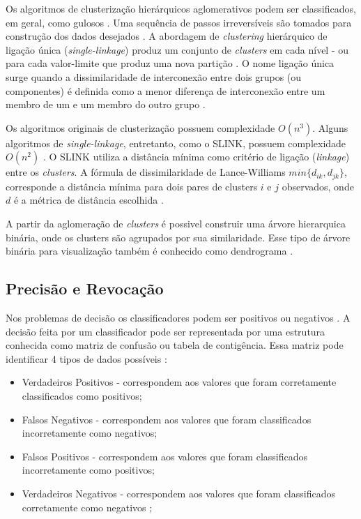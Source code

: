\begin{document}
Os algoritmos de clusterização hierárquicos aglomerativos podem ser classificados, em geral, como gulosos \cite{SINGLE_LINKAGE}. Uma sequência de passos irreversíveis são tomados para construção dos dados desejados \cite{SINGLE_LINKAGE}. A abordagem de \textit{clustering} hierárquico de ligação única (\textit{single-linkage}) produz um conjunto de \textit{clusters} em cada nível - ou para cada valor-limite que produz uma nova partição \cite{SINGLE_LINKAGE}. O nome ligação única surge quando a dissimilaridade de interconexão entre dois grupos (ou componentes) é definida como a menor diferença de interconexão entre um membro de um e um membro do outro grupo \cite{SINGLE_LINKAGE}.

Os algoritmos originais de clusterização possuem complexidade $O(n^3)$. Alguns algoritmos de \textit{single-linkage}, entretanto, como o SLINK, possuem complexidade $O(n^2)$ \cite{SLINK} \cite{SINGLE_LINKAGE}. O SLINK utiliza a distância mínima como critério de ligação (\textit{linkage}) entre os \textit{clusters}. A fórmula de dissimilaridade de Lance-Williams $min\{d_{ik}, d_{jk}\}$, corresponde a distância mínima para dois pares de clusters $i$ e $j$ observados, onde $d$ é a métrica de distância escolhida \cite{SINGLE_LINKAGE}.

A partir da aglomeração de \textit{clusters} é possivel construir uma árvore hierarquica binária, onde os clusters são agrupados por sua similaridade. Esse tipo de árvore binária para visualização também é conhecido como dendrograma \cite{SINGLE_LINKAGE}.


\subsection{Precisão e Revocação} \label{ssec:prec_recall}

Nos problemas de decisão os classificadores podem ser positivos ou negativos \cite{PRECISION_RECALL}. A decisão feita por um classificador pode ser representada por uma estrutura conhecida como matriz de confusão ou tabela de contigência. Essa matriz pode identificar 4 tipos de dados possíveis \cite{PRECISION_RECALL}:

\begin{itemize}
 \item Verdadeiros Positivos - correspondem aos valores que foram corretamente classificados como positivos;
 \item Falsos Negativos - correspondem aos valores que foram classificados incorretamente como negativos;
 \item Falsos Positivos - correspondem aos valores que foram classificados incorretamente como positivos;
 \item Verdadeiros Negativos - correspondem aos valores que foram classificados corretamente como negativos \cite{PRECISION_RECALL};
\end{itemize}
\end{document}
